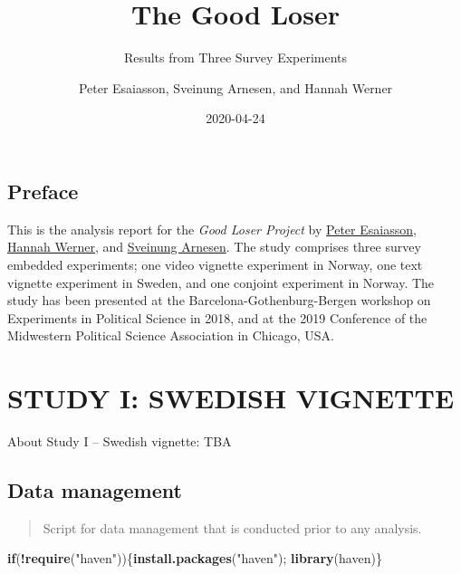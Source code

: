 \documentclass[
]{book}
\title{The Good Loser}
\subtitle{Results from Three Survey Experiments}
\author{Peter Esaiasson, Sveinung Arnesen, and Hannah Werner}
\date{2020-04-24}
\newenvironment{Shaded}{\begin{snugshade}}{\end{snugshade}}
\newcommand{\ControlFlowTok}[1]{\textcolor[rgb]{0.13,0.29,0.53}{\textbf{#1}}}
\newcommand{\KeywordTok}[1]{\textcolor[rgb]{0.13,0.29,0.53}{\textbf{#1}}}
\newcommand{\NormalTok}[1]{#1}
\newcommand{\OperatorTok}[1]{\textcolor[rgb]{0.81,0.36,0.00}{\textbf{#1}}}
\newcommand{\StringTok}[1]{\textcolor[rgb]{0.31,0.60,0.02}{#1}}
\begin{document}
\maketitle

{
\hypersetup{linkcolor=}
\setcounter{tocdepth}{1}
\tableofcontents
}
\hypertarget{preface}{%
\chapter{Preface}\label{preface}}

This is the analysis report for the \emph{Good Loser Project} by \href{https://www.gu.se/omuniversitetet/personal/?userId=xesape}{Peter Esaiasson}, \href{http://www.uva.nl/profiel/w/e/h.i.werner/h.i.werner.html}{Hannah Werner}, and \href{http://frosty-bose-c7f82c.netlify.com/}{Sveinung Arnesen}.
The study comprises three survey embedded experiments; one video vignette experiment in Norway, one text vignette experiment in Sweden, and one conjoint experiment in Norway. The study has been presented at the Barcelona-Gothenburg-Bergen workshop on Experiments in Political Science in 2018, and at the 2019 Conference of the Midwestern Political Science Association in Chicago, USA.

\hypertarget{part-study-i-swedish-vignette}{%
\part{STUDY I: SWEDISH VIGNETTE}\label{part-study-i-swedish-vignette}}

About Study I -- Swedish vignette: TBA

\hypertarget{data-management}{%
\chapter{Data management}\label{data-management}}

\begin{quote}
Script for data management that is conducted prior to any analysis.
\end{quote}

\begin{Shaded}
\begin{Highlighting}[]
\ControlFlowTok{if}\NormalTok{(}\OperatorTok{!}\KeywordTok{require}\NormalTok{(}\StringTok{"haven"}\NormalTok{))\{}\KeywordTok{install.packages}\NormalTok{(}\StringTok{"haven"}\NormalTok{);  }\KeywordTok{library}\NormalTok{(haven)\}}
\end{Highlighting}
\end{Shaded}
\end{document}

